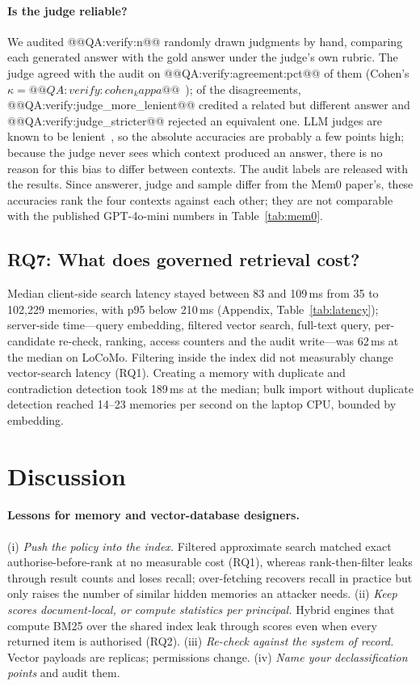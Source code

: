 \documentclass[11pt,a4paper]{article}
\theoremstyle{remark}
\begin{document}
\paragraph{Is the judge reliable?} We audited @@QA:verify:n@@ randomly drawn judgments by hand, comparing each generated
answer with the gold answer under the judge's own rubric. The judge agreed with the audit on @@QA:verify:agreement:pct@@ of
them (Cohen's $\kappa = @@QA:verify:cohen_kappa@@$~\cite{cohen1960}); of the disagreements, @@QA:verify:judge_more_lenient@@
credited a related but different answer and @@QA:verify:judge_stricter@@ rejected an equivalent one. LLM judges are known to be
lenient~\cite{zheng2023judging}, so the absolute accuracies are probably a few points high; because the judge never sees which
context produced an answer, there is no reason for this bias to differ between contexts. The audit labels are released with
the results. Since answerer, judge and sample differ from the Mem0 paper's, these accuracies rank the four contexts against
each other; they are not comparable with the published GPT-4o-mini numbers in Table~\ref{tab:mem0}.

\subsection{RQ7: What does governed retrieval cost?}
\label{sec:rq7}

Median client-side search latency stayed between 83 and 109\,ms from 35 to 102{,}229 memories, with p95 below 210\,ms
(Appendix, Table~\ref{tab:latency}); server-side time---query embedding, filtered vector search, full-text query,
per-candidate re-check, ranking, access counters and the audit write---was 62\,ms at the median on LoCoMo. Filtering inside
the index did not measurably change vector-search latency (RQ1). Creating a memory with duplicate and contradiction detection took 189\,ms
at the median; bulk import without duplicate detection reached 14--23 memories per second on the laptop CPU, bounded by
embedding.

\section{Discussion}
\label{sec:discussion}

\paragraph{Lessons for memory and vector-database designers.} (i) \emph{Push the policy into the index.} Filtered
approximate search matched exact authorise-before-rank at no measurable cost (RQ1), whereas rank-then-filter leaks through
result counts and loses recall; over-fetching recovers recall in practice but only raises the number of similar hidden
memories an attacker needs. (ii) \emph{Keep scores document-local, or compute statistics per principal.} Hybrid engines
that compute BM25 over the shared index leak through scores even when every returned item is authorised (RQ2).
(iii) \emph{Re-check against the system of record.} Vector payloads are replicas; permissions change. (iv) \emph{Name your
declassification points} and audit them.
\end{document}

